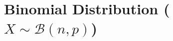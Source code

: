 \chapter{Binomial Distribution ($X \sim \mathcal{B}(n, p)$) \cite{ism-1,mfml-1,wiki/Binomial_distribution}} \label{Binomial Distribution}

























